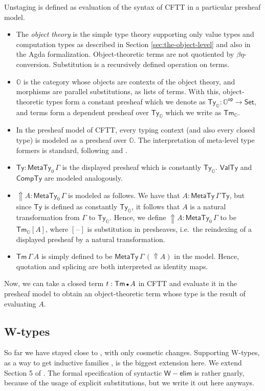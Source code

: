 \documentclass[acmsmall]{acmart}
\newcommand{\msf}[1]{{\mathsf{#1}}}
\newcommand{\mbb}[1]{\mathbb{#1}}
\newcommand{\emptycon}{\scaleobj{.75}\bullet}
\newcommand{\Tyo}{\msf{Ty}_{\mbbo}}
\newcommand{\Tmo}{\msf{Tm}_{\mbbo}}
\newcommand{\mbbo}{\mbb{O}}
\newcommand{\vW}{\mathsf{W}}
\newcommand{\Set}{\msf{Set}}
\newcommand{\Tm}{\msf{Tm}}
\newcommand{\Lift}{{\Uparrow}}
\newcommand{\MTy}{\msf{MetaTy}}
\newcommand{\VTy}{\msf{ValTy}}
\newcommand{\Ty}{\msf{Ty}}
\newcommand{\CTy}{\msf{CompTy}}
\newcommand{\blank}{{\mathord{\hspace{1pt}\text{--}\hspace{1pt}}}}
\theoremstyle{remark}
\begin{document}
Unstaging is defined as evaluation of the syntax of CFTT in a particular
presheaf model.
\begin{itemize}
  \item The \emph{object theory} is the simple type theory supporting only value
    types and computation types as described in Section
    \ref{sec:the-object-level} and also in the Agda
    formalization. Object-theoretic terms are not quotiented by
    $\beta\eta$-conversion. Substitution is a recursively defined operation on
    terms.
  \item $\mbbo$ is the category whose objects are contexts of the object theory,
    and morphisms are parallel substitutions, as lists of terms. With this,
    object-theoretic types form a constant presheaf which we denote
    as $\Tyo : \mbbo^{\msf{op}} \to \Set$, and terms form a dependent presheaf over $\Tyo$ which we write as
    $\Tmo$.
  \item
  In the presheaf model of CFTT, every typing context (and also every closed
  type) is modeled as a presheaf over $\mbbo$. The interpretation of meta-level
  type formers is standard, following \cite{Hofmann97syntaxand} and \cite{huber-thesis}.
\item $\Ty : \MTy_0\,\Gamma$ is the displayed presheaf which is constantly
  $\Tyo$. $\VTy$ and $\CTy$ are modeled analogously.
\item $\Lift A : \MTy_0\,\Gamma$ is modeled as follows. We have that $A :
  \MTy\,\Gamma\,\Ty$, but since $\Ty$ is defined as constantly $\Tyo$, it
  follows that $A$ is a natural transformation from $\Gamma$ to $\Tyo$. Hence,
  we define $\Lift A : \MTy_0\,\Gamma$ to be $\Tmo[A]$, where $[\blank]$ is
  substitution in presheaves, i.e.\ the reindexing of a displayed presheaf by a
  natural transformation.
\item
  $\Tm\,\Gamma\,A$ is simply defined to be $\MTy\,\Gamma\,(\Lift A)$ in the model. Hence,
  quotation and splicing are both interpreted as identity maps.
\end{itemize}
Now, we can take a closed term $t : \Tm\,\emptycon\,A$ in CFTT and evaluate it
in the presheaf model to obtain an object-theoretic term whose type is the
result of evaluating $A$.

\subsection{W-types}
So far we have stayed close to \cite{staged2ltt}, with only cosmetic
changes. Supporting W-types, as a way to get inductive families \cite{whynotw},
is the biggest extension here. We extend Section 5 of \cite{staged2ltt}. The
formal specification of syntactic $\vW{-}\msf{elim}$ is rather gnarly, because
of the usage of explicit substitutions, but we write it out here anyways.
\end{document}

